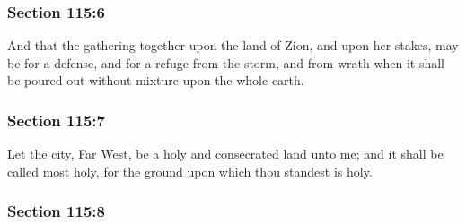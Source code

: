 
	\subsubsection{Section 115:6} %
		\label{DC115-6}

		And that the gathering together upon the land of Zion, and upon her stakes, may be for a defense, and for a refuge from the storm, and from wrath when it shall be poured out without mixture upon the whole earth.


	\subsubsection{Section 115:7} %
		\label{DC115-7}

		Let the city, Far West, be a holy and consecrated land unto me; and it shall be called most holy, for the ground upon which thou standest is holy.


	\subsubsection{Section 115:8} %
		\label{DC115-8}

